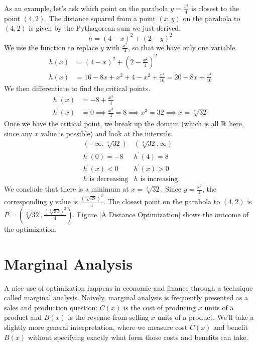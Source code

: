 \documentclass[fleqn]{report}
\begin{document}
\begin{example}
As an example, let's ask which point on the parabola $y =
\frac{x^2}{4}$ is closest to the point $(4,2)$.  The distance
squared from a  point $(x,y)$ on the parabola to $(4,2)$ is
given by the Pythagorean sum we just derived.
\begin{equation*}
h = (4-x)^2 + (2-y)^2
\end{equation*}
We use the function to replace $y$ with $\frac{x^2}{4}$, so
that we have only one variable.
\begin{align*}
h(x) & = (4-x)^2 + \left(2-\frac{x^2}{4} \right)^2 \\
h(x) & = 16 - 8x + x^2 + 4 - x^2 + \frac{x^4}{16} 
= 20 - 8x + \frac{x^4}{16} 
\end{align*}
We then differentiate to find the critical points.
\begin{align*}
h^\prime(x) & = -8 + \frac{x^3}{4} \\
h^\prime(x) & = 0 \implies \frac{x^3}{4} = 8 \implies 
x^3 = 32 \implies x = \sqrt[3]{32}
\end{align*}
Once we have the critical point, we break up the domain (which
is all $\mathbb{R}$ here, since any $x$ value is possible) and look
at the intervals.
\begin{displaymath}
\begin{array}{cc}
\left(-\infty, \sqrt[3]{32} \right) & \left( \sqrt[3]{32},
\infty \right) \\[1em]
h^\prime(0) = -8 & h^\prime(4) = 8 \\[1em]
h^\prime(x) < 0 & h^\prime(x) > 0 \\[1em]
h \text{ is decreasing} & h \text{ is increasing}
\end{array}
\end{displaymath}
We conclude that there is a minimum at $x=\sqrt[3]{32}$.
Since $y = \frac{x^2}{4}$, the corresponding $y$ value is
$\frac{(\sqrt[3]{32})^2}{4}$.  The closest point on the
parabola to $(4,2)$ is $P = \left( \sqrt[3]{32},
\frac{(\sqrt[3]{32})^2}{4} \right)$. Figure \ref{A Distance
Optimization} shows the outcome of the optimization.
\end{example}

\chapter{Marginal Analysis}
\label{Marginal Analysis}

A nice use of optimization happens in economic and finance
through a technique called marginal analysis.  Naively,
marginal analysis is frequently presented as a sales and
production question: $C(x)$ is the cost of producing $x$ units
of a product and $B(x)$ is the revenue from selling $x$ units
of a product. We'll take a slightly more general
interpretation, where we measure cost $C(x)$ and benefit
$B(x)$ without specifying exactly what form those costs and
benefits can take.
\end{document}
